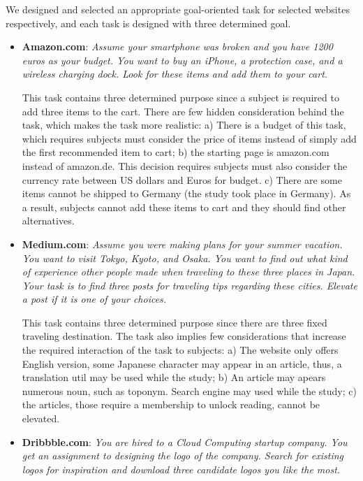 We designed and selected an appropriate goal-oriented task for selected websites respectively,
and each task is designed with three determined goal.

\begin{itemize}
    \item \textbf{Amazon.com}: \emph{Assume your smartphone was broken and you have 1200 euros 
    as your budget. You want to buy an iPhone, a protection case, and a wireless 
    charging dock. Look for these items and add them to your cart.}

        This task contains three determined purpose since a subject is required to add three items
        to the cart. There are few hidden consideration behind the task, which makes the task
        more realistic: a) There is a budget of this task, which requires subjects must consider the
        price of items instead of simply add the first recommended item to cart; 
        b) the starting page is amazon.com instead of amazon.de. This decision requires
        subjects must also consider the currency rate between US dollars and Euros for budget.
        c) There are some items cannot be shipped to Germany (the study took place in Germany).
        As a result, subjects cannot add these items to cart and they should find other alternatives.

    \item \textbf{Medium.com}: \emph{Assume you were making plans for your summer vacation. 
        You want to visit Tokyo, Kyoto, and Osaka. You want to find out what kind of experience other people made 
        when traveling to these three places in Japan. Your task is to find three posts 
        for traveling tips regarding these cities. Elevate a post if it is one of your choices.}

        This task contains three determined purpose since there are three fixed traveling destination.
        The task also implies few considerations that increase the required interaction of the task to subjects:
        a) The website only offers English version, some Japanese character may appear in an article,
        thus, a translation util may be used while the study;
        b) An article may apears numerous noun, such as toponym. Search engine may used while the study;
        c) the articles, those require a membership to unlock reading, cannot be elevated. 


    \item \textbf{Dribbble.com}: \emph{You are hired to a Cloud Computing startup company. You get an assignment to 
        designing the logo of the company. Search for existing logos for inspiration and 
        download three candidate logos you like the most.}


\end{itemize}
